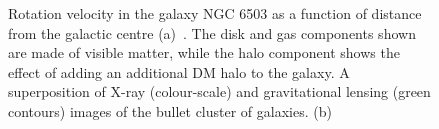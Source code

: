 \begin{figure}

  \caption{Rotation velocity in the galaxy NGC 6503 as a function of distance from the galactic centre (a)~\cite{Freese:2008cz}. The disk and gas components shown are made of visible matter, while the halo component shows the effect of adding an additional \ac{DM} halo to the galaxy. A superposition of X-ray (colour-scale) and gravitational lensing (green contours) images of the bullet cluster of galaxies. (b)~\cite{1538-4357-648-2-L109}}
  \label{fig:dmevidence}
\end{figure}

